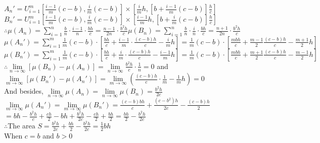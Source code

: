 \documentclass{article}
\begin{document}
\qquad$A_n'=U_{i=1}^{m}\left[\frac{i-1}{m}(c-b),\frac{i}{m}(c-b)\right]\times\left[\frac{i}{m}h,[b+\frac{i-1}{m}(c-b)]\frac{h}{c}\right]$\quad$B_n'=U_{i=1}^{m}\left[\frac{i-1}{m}(c-b),\frac{i}{m}(c-b)\right]\times\left[\frac{i-1}{m}h,[b+\frac{i}{m}(c-b)]\frac{h}{c}\right]$\\

$\therefore$\qquad$\displaystyle\mu(A_n)=\sum \limits_{i=1}^{n}\frac{b}{n}\cdot\frac{i-1}{n}\cdot\frac{bh}{c}=\frac{n-1}{2n}\cdot\frac{b^2h}{c}$\qquad$\displaystyle\mu(B_n)=\sum \limits_{i=1}^{n}\frac{b}{n}\cdot\frac{i}{n}\cdot\frac{bh}{c}=\frac{n+1}{2n}\cdot\frac{b^2h}{c}$\\

\qquad$\displaystyle\mu(A_n')=\sum \limits_{i=1}^{m}\frac{1}{m}(c-b)\cdot\left[\frac{bh}{c}+\frac{i-1}{m}\cdot\frac{(c-b)h}{c}-\frac{i}{m}h\right]=\frac{1}{m}(c-b)\cdot\left[\frac{mbh}{c}+\frac{m-1}{2}\frac{(c-b)h}{c}-\frac{m+1}{2}h\right]$\\

\qquad$\displaystyle\mu(B_n')=\sum \limits_{i=1}^{m}\frac{1}{m}(c-b)\cdot\left[\frac{bh}{c}+\frac{i}{m}\cdot\frac{(c-b)h}{c}-\frac{i-1}{m}h\right]=\frac{1}{m}(c-b)\cdot\left[\frac{mbh}{c}+\frac{m+1}{2}\frac{(c-b)h}{c}-\frac{m-1}{2}h\right]$\\

$\therefore$\qquad$\displaystyle\lim \limits_{n \to \infty}[\mu(B_n)-\mu(A_n)]=\lim \limits_{n \to \infty}\frac{b^2h}{c}\cdot\frac{1}{n}=0$ and $\lim \limits_{m \to \infty}[\mu(B_n')-\mu(A_n')]=\lim \limits_{m \to \infty}\left(\frac{(c-b)h}{c}\cdot\frac{1}{m}-\frac{1}{m}h\right)=0$\\

And besides, $\displaystyle\lim \limits_{n \to \infty}\mu(A_n)=\lim \limits_{n \to \infty}\mu(B_n)=\frac{b^2h}{2c}$\\

\qquad\qquad\qquad$\displaystyle\lim \limits_{m \to \infty}\mu(A_n')=\lim \limits_{m \to \infty}\mu(B_n')=\frac{(c-b)bh}{c}+\frac{(c-b^2)h}{2c}-\frac{(c-b)h}{2}$\\

\qquad\qquad\qquad\qquad$\displaystyle=bh-\frac{b^2h}{c}+\frac{ch}{2}-bh+\frac{b^2h}{2c}-\frac{ch}{2}+\frac{bh}{2}=\frac{bh}{2}-\frac{b^2h}{2c}$\\

$\therefore$\qquad The area $S=\displaystyle\frac{b^2h}{2c}+\frac{bh}{2}-\frac{b^2h}{2c}=\frac{1}{2}bh$\\

When $c=b$ and $b>0$\\
\end{document}
